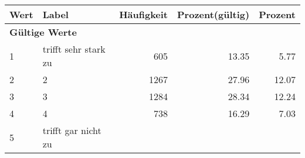      \begin{longtable}{lXrrr}
     \toprule
     \textbf{Wert} & \textbf{Label} & \textbf{Häufigkeit} & \textbf{Prozent(gültig)} & \textbf{Prozent} \\
     \endhead
     \midrule
     \multicolumn{5}{l}{\textbf{Gültige Werte}}\\

     1 &
     \multicolumn{1}{X}{ trifft sehr stark zu   } &


       \num{605} &
       \num[round-mode=places,round-precision=2]{13.35} &
         \num[round-mode=places,round-precision=2]{5.77} \\

     2 &
     \multicolumn{1}{X}{ 2   } &


       \num{1267} &
       \num[round-mode=places,round-precision=2]{27.96} &
         \num[round-mode=places,round-precision=2]{12.07} \\

     3 &
     \multicolumn{1}{X}{ 3   } &


       \num{1284} &
       \num[round-mode=places,round-precision=2]{28.34} &
         \num[round-mode=places,round-precision=2]{12.24} \\

     4 &
     \multicolumn{1}{X}{ 4   } &


       \num{738} &
       \num[round-mode=places,round-precision=2]{16.29} &
         \num[round-mode=places,round-precision=2]{7.03} \\

     5 &
     \multicolumn{1}{X}{ trifft gar nicht zu   } &



\end{longtable}
